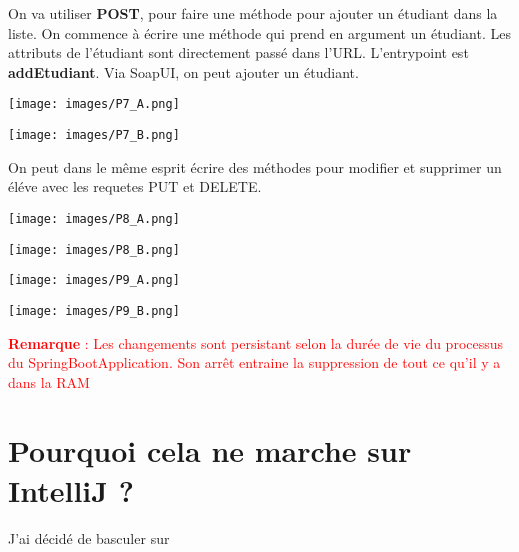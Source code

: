 \documentclass{rapport}
\begin{document}
On va utiliser \textbf{POST}, pour faire une méthode pour ajouter un étudiant dans la liste. On commence à écrire une méthode qui prend en argument un étudiant. Les attributs de l'étudiant sont directement passé dans l'URL. L'entrypoint est \textbf{addEtudiant}. Via SoapUI, on peut ajouter un étudiant.

\begin{minipage}{0.5\textwidth}
\texttt{[image: images/P7\_A.png]}
\label{fig:figure}
\end{minipage}
\hspace{1cm}
\begin{minipage}{0.5\textwidth}
\texttt{[image: images/P7\_B.png]}
\label{fig:figure}
\vspace{1cm}
\end{minipage}

On peut dans le même esprit écrire des méthodes pour modifier et supprimer un éléve avec les requetes PUT et DELETE.

\begin{minipage}{0.5\textwidth}
\texttt{[image: images/P8\_A.png]}
\label{fig:figure}
\end{minipage}
\hspace{1cm}
\begin{minipage}{0.5\textwidth}
\texttt{[image: images/P8\_B.png]}
\label{fig:figure}
\vspace{1cm}
\end{minipage}

\begin{minipage}{0.5\textwidth}
\texttt{[image: images/P9\_A.png]}
\label{fig:figure}
\end{minipage}
\hspace{1cm}
\begin{minipage}{0.5\textwidth}
\texttt{[image: images/P9\_B.png]}
\label{fig:figure}
\vspace{1cm}
\end{minipage}


\textcolor{red}{\textbf{Remarque} : Les changements sont persistant selon la durée de vie du processus du SpringBootApplication. Son arrêt entraine la suppression de tout ce qu'il y a dans la RAM}

\section{Pourquoi cela ne marche sur IntelliJ ?}

J'ai décidé de basculer sur 
\end{document}
